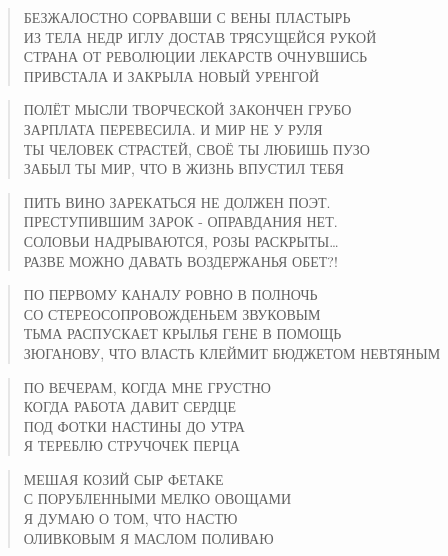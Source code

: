 \poemtitle{***}
\begin{verse}
БЕЗЖАЛОСТНО СОРВАВШИ С ВЕНЫ ПЛАСТЫРЬ\\
ИЗ ТЕЛА НЕДР ИГЛУ ДОСТАВ ТРЯСУЩЕЙСЯ РУКОЙ\\
СТРАНА ОТ РЕВОЛЮЦИИ ЛЕКАРСТВ ОЧНУВШИСЬ\\
ПРИВСТАЛА И ЗАКРЫЛА НОВЫЙ УРЕНГОЙ
\end{verse}

\poemtitle{***}
\begin{verse}
ПОЛЁТ МЫСЛИ ТВОРЧЕСКОЙ ЗАКОНЧЕН ГРУБО\\
ЗАРПЛАТА ПЕРЕВЕСИЛА. И МИР НЕ У РУЛЯ\\
ТЫ ЧЕЛОВЕК СТРАСТЕЙ, СВОЁ ТЫ ЛЮБИШЬ ПУЗО\\
ЗАБЫЛ ТЫ МИР, ЧТО В ЖИЗНЬ ВПУСТИЛ ТЕБЯ
\end{verse}

\poemtitle{***}
\begin{verse}
ПИТЬ ВИНО ЗАРЕКАТЬСЯ НЕ ДОЛЖЕН ПОЭТ.\\
ПРЕСТУПИВШИМ ЗАРОК - ОПРАВДАНИЯ НЕТ.\\
СОЛОВЬИ НАДРЫВАЮТСЯ, РОЗЫ РАСКРЫТЫ…\\
РАЗВЕ МОЖНО ДАВАТЬ ВОЗДЕРЖАНЬЯ ОБЕТ?!
\end{verse}

\poemtitle{***}
\begin{verse}
ПО ПЕРВОМУ КАНАЛУ РОВНО В ПОЛНОЧЬ\\
СО СТЕРЕОСОПРОВОЖДЕНЬЕМ ЗВУКОВЫМ\\
ТЬМА РАСПУСКАЕТ КРЫЛЬЯ ГЕНЕ В ПОМОЩЬ\\
ЗЮГАНОВУ, ЧТО ВЛАСТЬ КЛЕЙМИТ БЮДЖЕТОМ НЕВТЯНЫМ
\end{verse}

\poemtitle{***}
\begin{verse}
ПО ВЕЧЕРАМ, КОГДА МНЕ ГРУСТНО\\
КОГДА РАБОТА ДАВИТ СЕРДЦЕ\\
ПОД ФОТКИ НАСТИНЫ ДО УТРА\\
Я ТЕРЕБЛЮ СТРУЧОЧЕК ПЕРЦА
\end{verse}

\poemtitle{***}
\begin{verse}
МЕШАЯ КОЗИЙ СЫР ФЕТАКЕ\\
С ПОРУБЛЕННЫМИ МЕЛКО ОВОЩАМИ\\
Я ДУМАЮ О ТОМ, ЧТО НАСТЮ\\
ОЛИВКОВЫМ Я МАСЛОМ ПОЛИВАЮ
\end{verse}

